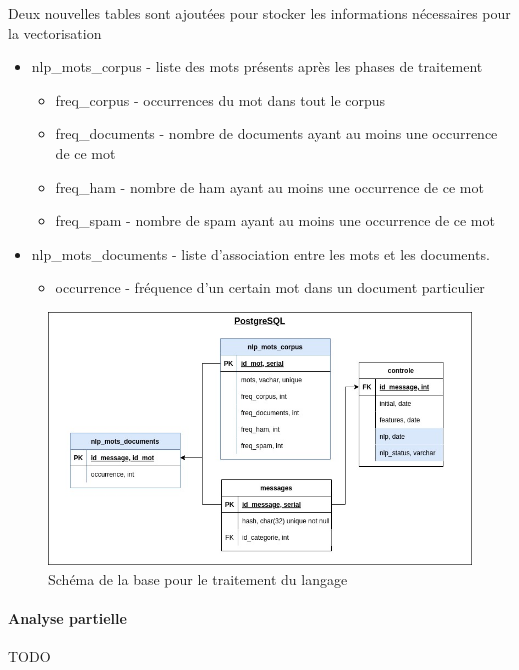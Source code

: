         Deux nouvelles tables sont ajoutées pour stocker les informations nécessaires pour la vectorisation
        \begin{itemize}
            \item nlp\_mots\_corpus - liste des mots présents après les phases de traitement
            \begin{itemize}
                \item freq\_corpus - occurrences du mot dans tout le corpus
                \item freq\_documents - nombre de documents ayant au moins une occurrence de ce mot
                \item freq\_ham - nombre de ham ayant au moins une occurrence de ce mot
                \item freq\_spam - nombre de spam ayant au moins une occurrence de ce mot
            \end{itemize}
            \item nlp\_mots\_documents - liste d'association entre les mots et les documents.
            \begin{itemize}
                \item occurrence - fréquence d'un certain mot dans un document particulier
            \end{itemize}
        \end{itemize}

        \begin{figure}[H]
            \includegraphics[width=\linewidth]{img/nlp_bdd}
            \caption{Schéma de la base pour le traitement du langage}
            \label{fig:nlp_db}
        \end{figure}

    \paragraph{Analyse partielle}
    TODO

